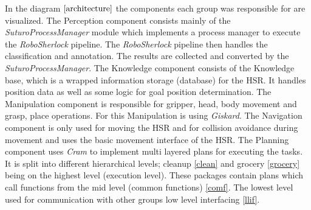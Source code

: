 \documentclass[main.tex]{subfiles}
\begin{document}
			In the diagram \(\ref{architecture}\) the components each group was responsible for are visualized. The Perception component consists mainly of the \textit{SuturoProcessManager} module which implements a process manager to execute the \textit{RoboSherlock} pipeline. The \textit{RoboSherlock} pipeline then handles the classification and annotation. The results are collected and converted by the \textit{SuturoProcessManager}.  The Knowledge component consists of the Knowledge base, which is a wrapped information storage (database) for the HSR. It handles position data as well as some logic for goal position determination. The Manipulation component is responsible for gripper, head, body movement and grasp, place operations. For this Manipulation is using \textit{Giskard}. The Navigation component is only used for moving the HSR and for collision avoidance during movement and uses the basic movement interface of the HSR. The Planning component uses \textit{Cram} to implement multi layered plans for executing the tasks. It is split into different hierarchical levels; cleanup \ref{clean} and grocery \ref{grocery} being on the highest level (execution level). These packages contain plans which call functions from the mid level (common functions) \ref{comf}. The lowest level used for communication with other groups low level interfacing \ref{llif}.
			
\end{document}
